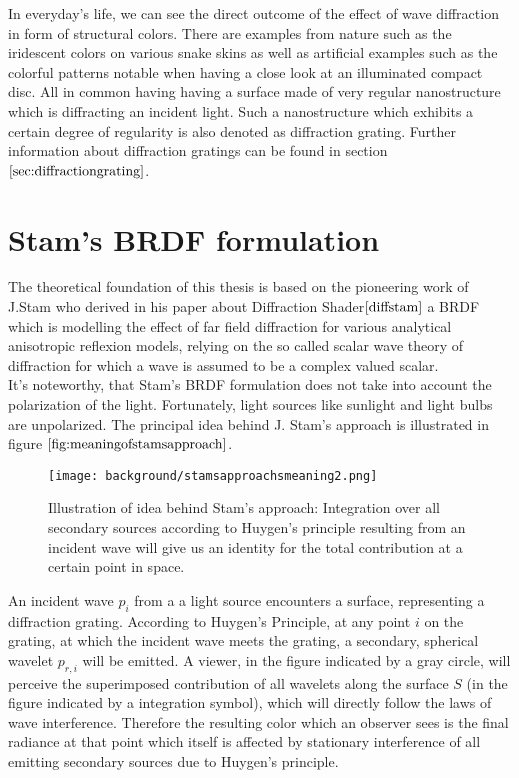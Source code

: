 In everyday's life, we can see the direct outcome of the effect of wave diffraction in form of structural colors. There are examples from nature such as the iridescent colors on various snake skins as well as artificial examples such as the colorful patterns notable when having a close look at an illuminated compact disc. All in common having having a surface made of very regular nanostructure which is diffracting an incident light. Such a nanostructure which exhibits a certain degree of regularity is also denoted as diffraction grating. Further information about diffraction gratings can be found in section $\ref{sec:diffractiongrating}$.

\section{Stam's BRDF formulation}
\label{sec:sumstam}
The theoretical foundation of this thesis is based on the pioneering work of J.Stam who derived in his paper about Diffraction Shader$\cite{diffstam}$ a BRDF which is modelling the effect of far field diffraction for various analytical anisotropic reflexion models, relying on the so called scalar wave theory of diffraction for which a wave is assumed to be a complex valued scalar. \\

It's noteworthy, that Stam's BRDF formulation does not take into account the polarization of the light. Fortunately, light sources like sunlight and light bulbs are unpolarized. The principal idea behind J. Stam's approach is illustrated in figure $\ref{fig:meaningofstamsapproach}$. 
\begin{figure}[H]
  \centering
  \texttt{[image: background/stamsapproachsmeaning2.png]}
  \caption[Idea behind Stam's approach]{Illustration of idea behind Stam's approach: Integration over all secondary sources according to Huygen's principle resulting from an incident wave will give us an identity for the total contribution at a certain point in space.}
  \label{fig:meaningofstamsapproach}  
\end{figure}

An incident wave $p_i$ from a a light source encounters a surface, representing a diffraction grating. According to Huygen's Principle, at any point $i$ on the grating, at which the incident wave meets the grating, a secondary, spherical wavelet $p_{r,i}$ will be emitted. A viewer, in the figure indicated by a gray circle, will perceive the superimposed contribution of all wavelets along the surface $S$ (in the figure indicated by a integration symbol), which will directly follow the laws of wave interference. Therefore the resulting color which an observer sees is the final radiance at that point which itself is affected by stationary interference of all emitting secondary sources due to Huygen's principle. \\

